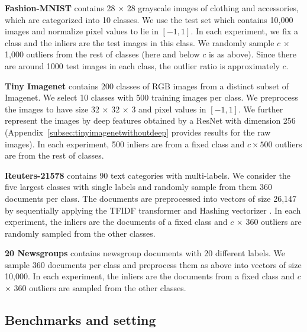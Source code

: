 \documentclass{article} \usepackage{iclr2020_conference,times}
\begin{document}
\textbf{Fashion-MNIST} contains 28 $\times$ 28 grayscale images of clothing and accessories, which are categorized into 10 classes. We use the test set which contains 10,000 images and  normalize pixel values to lie in $[-1,1]$. In each experiment, we fix a class and the inliers are the test images in this class. We randomly sample $c$ $\times$ 1,000 outliers from the rest of classes (here and below $c$ is as above). Since there are around 1000 test images in each class, the outlier ratio is approximately $c$.

\textbf{Tiny Imagenet} contains 200 classes of RGB images from a distinct subset of Imagenet. We select 10 classes with 500 training images per class. We preprocess the images to have size 32 $\times$ 32 $\times$ 3 and pixel values in $[-1,1]$. We further represent the images by deep features obtained by a ResNet \citep{he2016identity} with dimension 256 (Appendix~\ref{subsec:tinyimagenetwithoutdeep} provides results for the raw images).
In each experiment, 500 inliers are from a fixed class and $c \times 500$ outliers are from the rest of classes. 

\textbf{Reuters-21578} contains 90 text categories with multi-labels. We consider the five largest classes with single labels and randomly sample from them 360 documents per class. The documents are preprocessed into vectors of size 26,147 by sequentially applying the TFIDF transformer and Hashing vectorizer \citep{rajaraman2011mining}. In each experiment, the inliers are the documents of a fixed class and $c$ $\times$ 360 outliers are randomly sampled from the other classes. 

\textbf{20 Newsgroups} contains newsgroup documents with 20 different labels. We sample 360 documents per class and preprocess them as above into vectors of size 10,000.
In each experiment, the inliers are the documents from a fixed class and $c$ $\times$ 360 outliers are sampled from the other classes.


\subsection{Benchmarks and setting}\label{subsec:benchmark}
\end{document}
